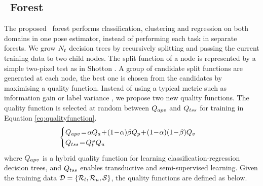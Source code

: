 \subsection{\STR\ Forest} 
\label{sec:methodology:strf}
The proposed \STR\ forest performs classification, clustering and regression on both domains in one pose estimator, instead of performing each task in separate forests.    
We grow $N_{t}$ decision trees by recursively splitting and passing the current training data to two child nodes. 
The split function of a node is represented by a simple two-pixel test as in Shotton \etal \cite{Shotton_CVPR_11}. 
A group of candidate split functions are generated at each node, the best one is chosen from the candidates by maximising a quality function.   
Instead of using a typical metric such as information gain or label variance \cite{Shotton_Book_13}, we propose two new quality functions.
The quality function is selected at random between $Q_{apv}$ and $Q_{tss}$ for training in Equation \ref{eq:qualityfunction}. 
\begin{equation}
	\begin{cases}
		\vpjterm\!=\!\viewparam\viewterm\!+\!(1\!-\!\viewparam)\classparam\classterm\!+\!(1\!-\!\viewparam)(1\!-\!\classparam)\regterm \\ 
		\tssterm\!=\!\pairterm^{\tssparam}\usterm 
	\end{cases}
	\label{eq:qualityfunction}
\end{equation}
where $Q_{apv}$ is a hybrid quality function for learning classification-regression decision trees, and $Q_{tss}$ enables transductive and semi-supervised learning. 
Given the training data $\mathcal{D} = \{\mathcal{R}_{l}, \mathcal{R}_{u}, \mathcal{S}\}$, the quality functions are defined as below.   

